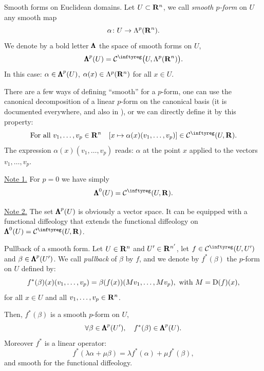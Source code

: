\begin{Article}{Smooth forms on Euclidean domains.}{}
  Let $U \subset \mathbf{R}^n$,
  we call \emph{smooth $p$-form} on $U$ any smooth map
  $$%
    \alpha \colon U \to \Lambda^p(\RR^n).
  $$%
  We denote by a bold letter ${\pmb{\Lambda}}$ the space of smooth forms on $U$,
  $$%
    \SmoothForms^p(U) = \Cinfty\big(U,\Lambda^p(\RR^n)\big).
  $$%
  In this case:
  $\alpha \in {\pmb{\Lambda}}^p(U)$,
  $\alpha(x) \in \Lambda^p(\mathbf{R}^n)$ for all $x \in U$.

  There are a few ways of defining ``smooth'' for a $p$-form,
  one can use the canonical decomposition of a linear $p$-form on the canonical basis
  (it is documented everywhere,
  and also in \cite{PIZ13}),
  or we can directly define it by this property:
  $$%
    \text{For all } v_1,\dots,v_p \in \RR^n
    \quad
    [x \mapsto \alpha(x)(v_1,\dots,v_p)] \in \Cinfty(U, \RR).
  $$%
  The expression $\alpha(x)(v_1,\dots,v_p)$ reads:
  $\alpha$ at the point $x$ applied to the vectors $v_1,\dots,v_p$.

  \uline{Note 1.} For $p=0$ we have simply
  $$%
    \SmoothForms^0(U) = \Cinfty(U,\RR).
  $$%

  \uline{Note 2.} The set ${\pmb{\Lambda}}^p(U)$ is obviously a vector space.
  It can be equipped with a functional diffeology that extends the functional diffeology on $\SmoothForms^0(U) = \Cinfty(U,\RR)$.
\end{Article}

\begin{Article}{Pullback of a smooth form.}{}
  Let $U \in \mathbf{R}^n$ and $U' \in \mathbf{R}^{n'}$,
  let $f \in \Cinfty(U,U')$ and $\beta \in {\pmb{\Lambda}}^p(U')$.
  We call \emph{pullback} of $\beta$ by $f$,
  and we denote by $f^*(\beta)$ the $p$-form on $U$ defined by:
  $$%
    f^*(\beta)(x)(v_1,\dots,v_p) = \beta(f(x))(M v_1,\dots,M v_p),
    \text{ with }
    M = \Der(f)(x),
  $$%
  for all $x \in U$ and all $v_1,\dots, v_p\in \mathbf{R}^n$.

  Then,
  $f^*(\beta)$ is a smooth $p$-form on $U$,
  $$%
    \forall \beta \in \SmoothForms^p(U'),
    \quad
    f^*(\beta) \in \SmoothForms^p(U).
  $$%
  Moreover $f^*$ is a linear operator:
  $$%
    f^*(\lambda \alpha + \mu \beta) = \lambda f^*(\alpha) + \mu f^*(\beta),
  $$%
  and smooth for the functional diffeology.
\end{Article}

